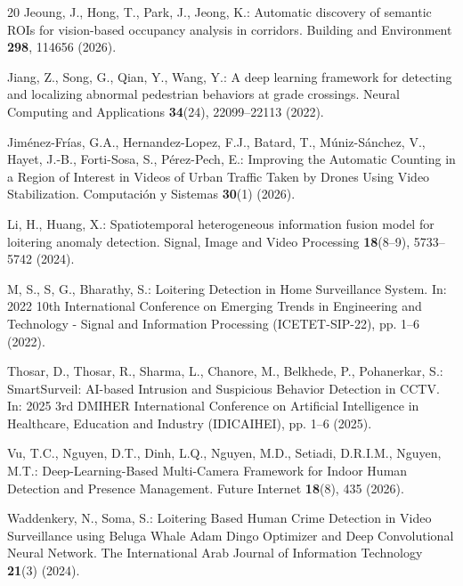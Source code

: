 \documentclass[runningheads]{llncs}
\begin{document}
\begin{thebibliography}{20}
Jeoung, J., Hong, T., Park, J., Jeong, K.: Automatic discovery of semantic ROIs for vision-based occupancy analysis in corridors. Building and Environment \textbf{298}, 114656 (2026). 

Jiang, Z., Song, G., Qian, Y., Wang, Y.: A deep learning framework for detecting and localizing abnormal pedestrian behaviors at grade crossings. Neural Computing and Applications \textbf{34}(24), 22099--22113 (2022). 

Jiménez-Frías, G.A., Hernandez-Lopez, F.J., Batard, T., Múniz-Sánchez, V., Hayet, J.-B., Forti-Sosa, S., Pérez-Pech, E.: Improving the Automatic Counting in a Region of Interest in Videos of Urban Traffic Taken by Drones Using Video Stabilization. Computación y Sistemas \textbf{30}(1) (2026). 

Li, H., Huang, X.: Spatiotemporal heterogeneous information fusion model for loitering anomaly detection. Signal, Image and Video Processing \textbf{18}(8--9), 5733--5742 (2024). 

M, S., S, G., Bharathy, S.: Loitering Detection in Home Surveillance System. In: 2022 10th International Conference on Emerging Trends in Engineering and Technology - Signal and Information Processing (ICETET-SIP-22), pp. 1--6 (2022). 

Thosar, D., Thosar, R., Sharma, L., Chanore, M., Belkhede, P., Pohanerkar, S.: SmartSurveil: AI-based Intrusion and Suspicious Behavior Detection in CCTV. In: 2025 3rd DMIHER International Conference on Artificial Intelligence in Healthcare, Education and Industry (IDICAIHEI), pp. 1--6 (2025). 

Vu, T.C., Nguyen, D.T., Dinh, L.Q., Nguyen, M.D., Setiadi, D.R.I.M., Nguyen, M.T.: Deep-Learning-Based Multi-Camera Framework for Indoor Human Detection and Presence Management. Future Internet \textbf{18}(8), 435 (2026). 

Waddenkery, N., Soma, S.: Loitering Based Human Crime Detection in Video Surveillance using Beluga Whale Adam Dingo Optimizer and Deep Convolutional Neural Network. The International Arab Journal of Information Technology \textbf{21}(3) (2024). 


\end{thebibliography}
\end{document}
